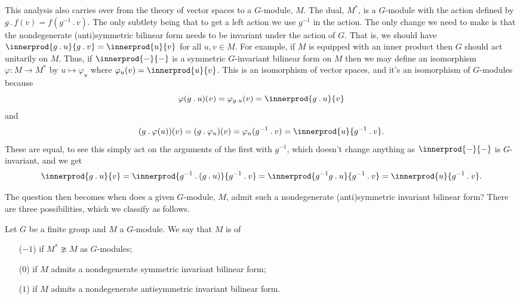 \documentclass[fleqn]{NotesClass}
\newcommand{\action}{\mathbin{.}}
\begin{document}
    This analysis also carries over from the theory of vector spaces to a \(G\)-module, \(M\).
    The dual, \(M^*\), is a \(G\)-module with the action defined by \(g \action f(v) = f(g^{-1} \action v)\).
    The only subtlety being that to get a left action we use \(g^{-1}\) in the action.
    The only change we need to make is that the nondegenerate (anti)symmetric bilinear form needs to be invariant under the action of \(G\).
    That is, we should have \(\innerprod{g \action u}{g \action v} = \innerprod{u}{v}\) for all \(u, v \in M\).
    For example, if \(M\) is equipped with an inner product then \(G\) should act unitarily on \(M\).
    Thus, if \(\innerprod{-}{-}\) is a symmetric \(G\)-invariant bilinear form on \(M\) then we may define an isomorphism \(\varphi \colon M \to M^*\) by \(u \mapsto \varphi_u\) where \(\varphi_u(v) = \innerprod{u}{v}\).
    This is an isomorphism of vector spaces, and it's an isomorphism of \(G\)-modules because
    \begin{equation}
        \varphi(g \action u)(v) = \varphi_{g \action u}(v) = \innerprod{g \action u}{v}
    \end{equation}
    and
    \begin{equation}
        (g \action \varphi(u))(v) = (g \action \varphi_u)(v) = \varphi_u(g^{-1} \action v) = \innerprod{u}{g^{-1} \action v}.
    \end{equation}
    These are equal, to see this simply act on the arguments of the first with \(g^{-1}\), which doesn't change anything as \(\innerprod{-}{-}\) is \(G\)-invariant, and we get
    \begin{equation}
        \innerprod{g \action u}{v} = \innerprod{g^{-1} \action (g \action u)}{g^{-1} \action v} = \innerprod{g^{-1}g \action u}{g^{-1} \action v} = \innerprod{u}{g^{-1} \action v}.
    \end{equation}
    
    The question then becomes when does a given \(G\)-module, \(M\), admit such a nondegenerate (anti)symmetric invariant bilinear form?
    There are three possibilities, which we classify as follows.
    
    \begin{dfn}{}{}
        Let \(G\) be a finite group and \(M\) a \(G\)-module.
        We say that \(M\) is of
        \begin{enumerate}
            \item[(\(-1\))]  if \(M^* \ncong M\) as \(G\)-modules;
            \item[(\(0\))]  if \(M\) admits a nondegenerate symmetric invariant bilinear form;
            \item[(\(1\))]  if \(M\) admits a nondegenerate antisymmetric invariant bilinear form.
        \end{enumerate}
    \end{dfn}
    
\end{document}

